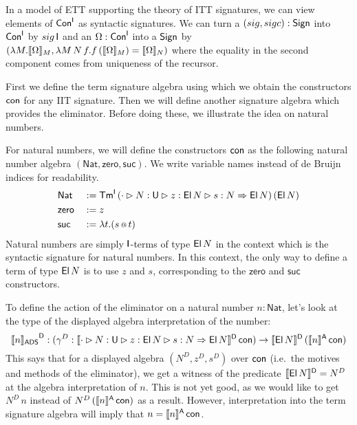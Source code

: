 \documentclass[a4paper,UKenglish,cleveref, autoref]{lipics-v2019}
\begin{document}
\begin{remark}
  In a model of ETT supporting the theory of ITT signatures, we can
  view elements of $\mathsf{Con}^{\mathsf{I}}$ as syntactic signatures. We can turn a
  $({sig},{sigc}) : \mathsf{Sign}$ into $\mathsf{Con}^{\mathsf{I}}$ by ${sig}\,\mathsf{I}$ and an
  $\Omega:\mathsf{Con}^{\mathsf{I}}$ into a $\mathsf{Sign}$ by
  $(\lambda M.\llbracket\Omega\rrbracket_M, \lambda M\,N\,f.f\,(\llbracket\Omega\rrbracket_M) =
  \llbracket\Omega\rrbracket_N)$ where the equality in the second component comes
  from uniqueness of the recursor.
\end{remark}

First we define the term signature algebra using which we obtain the
constructors $\mathsf{con}$ for any IIT signature. Then we will define another
signature algebra which provides the eliminator. Before doing these,
we illustrate the idea on natural numbers.
\begin{example}\label{eg:nat_con}
  For natural numbers, we will define the constructors $\mathsf{con}$ as the
  following natural number algebra
  $(\mathsf{Nat},\mathsf{zero},\mathsf{suc})$. We write variable names
  instead of de Bruijn indices for readability.
  \begin{alignat*}{5}
    & \mathsf{Nat} && := \mathsf{Tm}^{\mathsf{I}}\,(\cdot\rhd N:\mathsf{U}\rhd z:\mathsf{El}\,N\rhd s:N\Rightarrow\mathsf{El}\,N)\,(\mathsf{El}\,N) \\
    & \mathsf{zero} && := z \\
    & \mathsf{suc} && := \lambda t. (s\mathop{{\scriptstyle @}} t)
  \end{alignat*}
  Natural numbers are simply $\mathsf{I}$-terms of type $\mathsf{El}\,N$ in the
  context which is the syntactic signature for natural numbers. In
  this context, the only way to define a term of type $\mathsf{El}\,N$ is to
  use $z$ and $s$, corresponding to the $\mathsf{zero}$ and
  $\mathsf{suc}$ constructors.

  To define the action of the eliminator on a natural number
  $n : \mathsf{Nat}$, let's look at the type of the displayed algebra
  interpretation of the number:
  \[
    {\llbracket n \rrbracket_{\mathsf{ADS}}}^{\mathsf{D}} : (\gamma^D : \llbracket\cdot\rhd N:\mathsf{U}\rhd z:\mathsf{El}\,N\rhd s:N\Rightarrow\mathsf{El}\,N\rrbracket^{\mathsf{D}}\,\mathsf{con}) \rightarrow \llbracket\mathsf{El}\,N\rrbracket^{\mathsf{D}}\,(\llbracket n\rrbracket^{\mathsf{A}}\,\mathsf{con})
  \]
  This says that for a displayed algebra $(N^D,z^D,s^D)$ over $\mathsf{con}$
  (i.e.\ the motives and methods of the eliminator), we get a witness
  of the predicate $\llbracket\mathsf{El}\,N\rrbracket^{\mathsf{D}} = N^D$ at the algebra
  interpretation of $n$. This is not yet good, as we would like to get
  $N^D\,n$ instead of $N^D\,(\llbracket n\rrbracket^{\mathsf{A}}\,\mathsf{con})$ as a result. However,
  interpretation into the term signature algebra will imply that
  $n = \llbracket n\rrbracket^{\mathsf{A}}\,\mathsf{con}$.
\end{example}
\end{document}
